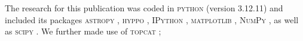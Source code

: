 \documentclass[fleqn,usenatbib]{mnras}
\begin{document}
The research for this publication was coded in \textsc{python} (version 3.12.11) and included its packages
\textsc{astropy} \citep[v. 7.1.0;][]{Robitaille2013,PriceWhelan2018},
\textsc{hyppo} \citep[v. 0.5.2;][]{hyppo},
\textsc{IPython} \citep[v. 9.1.0;][]{ipython},
\textsc{matplotlib} \citep[v. 3.10.3;][]{matplotlib},
\textsc{NumPy} \citep[v. 2.2.6;][]{numpy}, as well as
\textsc{scipy} \citep[v. 1.16.0;][]{Scipy}.
We further made use of \textsc{topcat} \citep[version 4.7;][]{Taylor2005};
 




\bsp
\label{lastpage}
\end{document}
